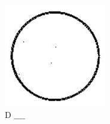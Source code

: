 \documentclass[10pt]{article}
\begin{document}
\begin{figure}[h]
\begin{center}
  \includegraphics[width=\textwidth]{2025_10_23_76620c17ffac1ae9b35bg-54}
\captionsetup{labelformat=empty}
\caption{D $\_\_\_\_$}
\end{center}
\end{figure}
\end{document}
